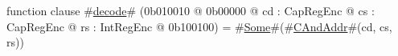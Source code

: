 function clause #\hyperref[zdecode]{decode}# (0b010010 @ 0b00000 @ cd : CapRegEnc @ cs : CapRegEnc @ rs : IntRegEnc @ 0b100100) = #\hyperref[zSome]{Some}#(#\hyperref[zCAndAddr]{CAndAddr}#(cd, cs, rs))
